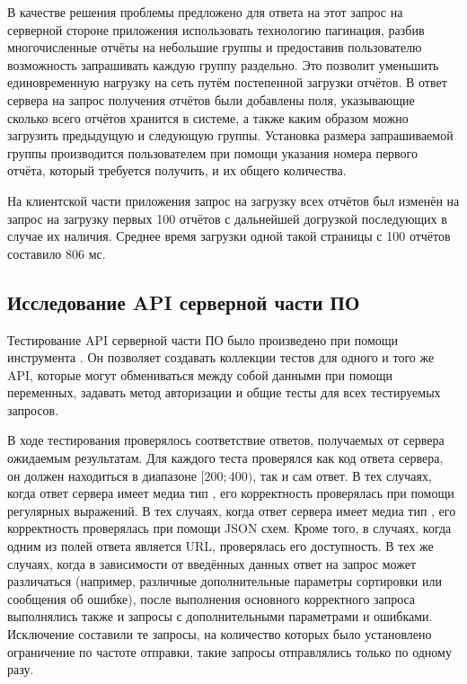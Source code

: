 \tab
В качестве решения проблемы предложено для ответа на этот запрос на серверной стороне приложения использовать технологию пагинация, разбив многочисленные отчёты на небольшие группы и предоставив пользователю возможность запрашивать каждую группу раздельно.
Это позволит уменьшить единовременную нагрузку на сеть путём постепенной загрузки отчётов.
В ответ сервера на запрос получения отчётов были добавлены поля, указывающие сколько всего отчётов хранится в системе, а также каким образом можно загрузить предыдущую и следующую группы.
Установка размера запрашиваемой группы производится пользователем при помощи указания номера первого отчёта, который требуется получить, и их общего количества.

\tab
На клиентской части приложения запрос на загрузку всех отчётов был изменён на запрос на загрузку первых 100 отчётов с дальнейшей догрузкой последующих в случае их наличия.
Среднее время загрузки одной такой страницы с 100 отчётов составило 806 мс.

\subsection{Исследование API серверной части ПО}

\tab
Тестирование API серверной части ПО было произведено при помощи инструмента \cite{postman}.
Он позволяет создавать коллекции тестов для одного и того же API, которые могут обмениваться между собой данными при помощи переменных, задавать метод авторизации и общие тесты для всех тестируемых запросов.

\tab
В ходе тестирования проверялось соответствие ответов, получаемых от сервера ожидаемым результатам. Для каждого теста проверялся как код ответа сервера, он должен находиться в диапазоне $[200; 400)$, так и сам ответ.
В тех случаях, когда ответ сервера имеет медиа тип , его корректность проверялась при помощи регулярных выражений. В тех случаях, когда ответ сервера имеет медиа тип , его корректность проверялась при помощи JSON схем.
Кроме того, в случаях, когда одним из полей ответа является URL, проверялась его доступность.
В тех же случаях, когда в зависимости от введённых данных ответ на запрос может различаться (например, различные дополнительные параметры сортировки или сообщения об ошибке), после выполнения основного корректного запроса выполнялись также и запросы с дополнительными параметрами и ошибками.
Исключение составили те запросы, на количество которых было установлено ограничение по частоте отправки, такие запросы отправлялись только по одному разу.

